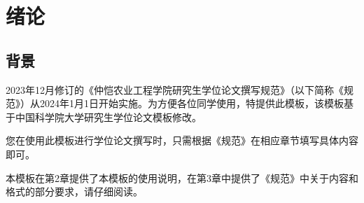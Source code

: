 \chapter{绪论}\label{chap:introduction}\thispagestyle{noheaderstyle}

\section{背景}

2023年12月修订的《仲恺农业工程学院研究生学位论文撰写规范》（以下简称《规范》）从2024年1月1日开始实施。为方便各位同学使用，特提供此模板，该模板基于中国科学院大学研究生学位论文模板修改。

您在使用此模板进行学位论文撰写时，只需根据《规范》在相应章节填写具体内容即可。

本模板在第2章提供了本模板的使用说明，在第3章中提供了《规范》中关于内容和格式的部分要求，请仔细阅读。


